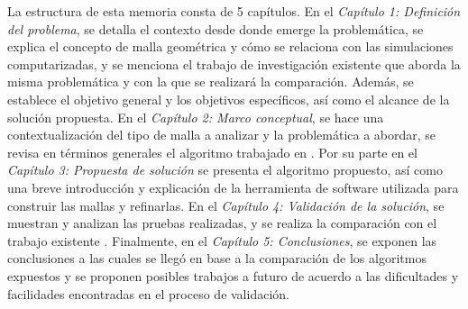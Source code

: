 La estructura de esta memoria consta de 5 capítulos. En el \textit{Capítulo 1: Definición del problema}, se detalla el contexto desde donde emerge la problemática, se explica el concepto de malla geométrica y cómo se relaciona con las simulaciones computarizadas, y se menciona el trabajo de investigación existente que aborda la misma problemática y con la que se realizará la comparación. Además, se establece el objetivo general y los objetivos específicos, así como el alcance de la solución propuesta.  En el \textit{Capítulo 2: Marco conceptual}, se hace una contextualización del tipo de malla a analizar y la problemática a abordar, se revisa en términos generales el algoritmo trabajado en \cite{daines2018repairing}.
Por su parte en el \textit{Capítulo 3: Propuesta de solución} se presenta el algoritmo propuesto, así como una breve introducción y explicación de la herramienta de software utilizada para construir las mallas y refinarlas.
En el \textit{Capítulo 4: Validación de la solución}, se muestran y analizan las pruebas realizadas, y se realiza la comparación con el trabajo existente \cite{daines2018repairing}.
Finalmente, en el \textit{Capítulo 5: Conclusiones}, se exponen las conclusiones a las cuales se llegó en base a la comparación de los algoritmos expuestos y se proponen posibles trabajos a futuro de acuerdo a las dificultades y facilidades encontradas en el proceso de validación.
